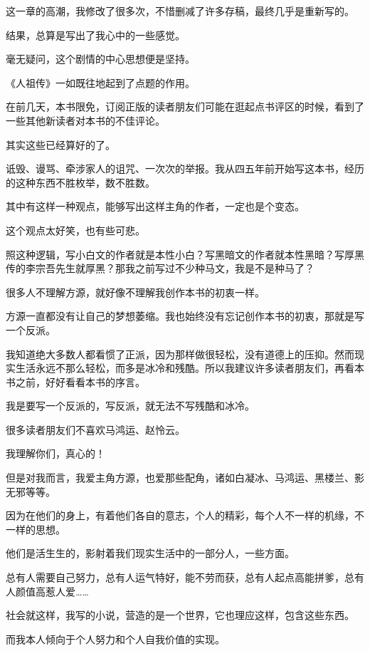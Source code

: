\begin{this_body} \par
这一章的高潮，我修改了很多次，不惜删减了许多存稿，最终几乎是重新写的。

结果，总算是写出了我心中的一些感觉。

毫无疑问，这个剧情的中心思想便是坚持。

《人祖传》一如既往地起到了点题的作用。

在前几天，本书限免，订阅正版的读者朋友们可能在逛起点书评区的时候，看到了一些其他新读者对本书的不佳评论。

其实这些已经算好的了。

诋毁、谩骂、牵涉家人的诅咒、一次次的举报。我从四五年前开始写这本书，经历的这种东西不胜枚举，数不胜数。

其中有这样一种观点，能够写出这样主角的作者，一定也是个变态。

这个观点太好笑，也有些可悲。

照这种逻辑，写小白文的作者就是本性小白？写黑暗文的作者就本性黑暗？写厚黑传的李宗吾先生就厚黑？那我之前写过不少种马文，我是不是种马了？

很多人不理解方源，就好像不理解我创作本书的初衷一样。

方源一直都没有让自己的梦想萎缩。我也始终没有忘记创作本书的初衷，那就是写一个反派。

我知道绝大多数人都看惯了正派，因为那样做很轻松，没有道德上的压抑。然而现实生活永远不那么轻松，而多是冰冷和残酷。所以我建议许多读者朋友们，再看本书之前，好好看看本书的序言。

我是要写一个反派的，写反派，就无法不写残酷和冰冷。

很多读者朋友们不喜欢马鸿运、赵怜云。

我理解你们，真心的！

但是对我而言，我爱主角方源，也爱那些配角，诸如白凝冰、马鸿运、黑楼兰、影无邪等等。

因为在他们的身上，有着他们各自的意志，个人的精彩，每个人不一样的机缘，不一样的思想。

他们是活生生的，影射着我们现实生活中的一部分人，一些方面。

总有人需要自己努力，总有人运气特好，能不劳而获，总有人起点高能拼爹，总有人颜值高惹人爱……

社会就这样，我写的小说，营造的是一个世界，它也理应这样，包含这些东西。

而我本人倾向于个人努力和个人自我价值的实现。


\end{this_body}
